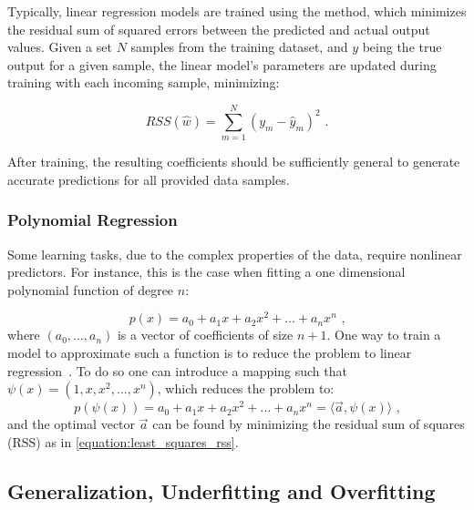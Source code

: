 Typically, linear regression models are trained using the  method, which minimizes the residual sum of squared errors between the predicted and actual output values.
Given a set \(N\) samples from the training dataset, and \(y\) being the true output for a given sample, the linear model's parameters are updated during training with each incoming sample, minimizing:

\begin{equation}
    RSS(\hat{w}) = \sum_{m=1}^{N} (y_m - \hat{y}_m)^2 \text{ .}
    \label{equation:least_squares_rss}
\end{equation}

After training, the resulting coefficients should be sufficiently general to generate accurate predictions for all provided data samples.

\subsubsection*{Polynomial Regression}

Some learning tasks, due to the complex properties of the data, require nonlinear predictors.
For instance, this is the case when fitting a one dimensional polynomial function of degree \(n\):

\begin{equation}
    p(x) = a_0 + a_1 x + a_2 x^2 + \dots + a_n x^n \text{ ,}
    \label{equation:polynomial_function}
\end{equation}
where \((a_0, \ldots, a_n)\) is a vector of coefficients of size \(n+1\).
One way to train a model to approximate such a function is to reduce the problem to linear regression~\cite{BOOK:ShalevShwartz:Understanding_Machine_Learning}.
To do so one can introduce a mapping such that \(\psi(x)=\left(1, x, x^2, \ldots, x^n\right)\), which reduces the problem to:
\begin{equation}
    p(\psi(x)) = a_0 + a_1 x + a_2 x^2 + \ldots + a_n x^n = \langle \vec{a}, \psi(x) \rangle \text{ ,}
    \label{equation:polynomial_function_linear_mapping}
\end{equation}
and the optimal vector \(\vec{a}\) can be found by minimizing the residual sum of squares (RSS) as in \cref{equation:least_squares_rss}.

\subsection{Generalization, Underfitting and Overfitting}

